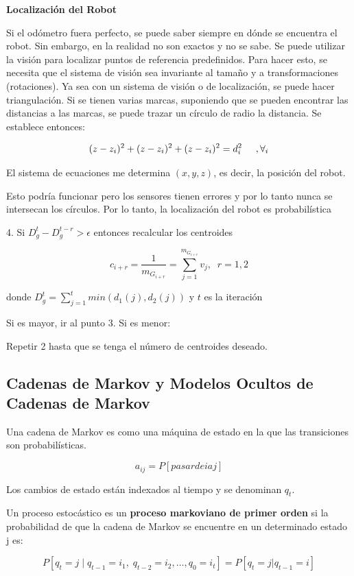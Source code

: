 \textbf{Localización del Robot}


Si el odómetro fuera perfecto, se puede saber siempre en dónde se encuentra el robot. Sin embargo, en la
realidad no son exactos y no se sabe.
Se puede utilizar la visión para localizar puntos de referencia predefinidos.
Para hacer esto, se necesita que el sistema de visión sea invariante al tamaño y a transformaciones
(rotaciones).
Ya sea con un sistema de visión o de localización, se puede hacer triangulación.
Si se tienen varias marcas, suponiendo que se pueden encontrar las distancias a las marcas, se puede trazar un
círculo de radio la distancia.
Se establece entonces:

$$(z-z_i)^2 + (z-z_i)^2 + (z-z_i)^2 =d_{i}^2 \hspace{0.5cm} ,   \forall_i$$

El sistema de ecuaciones me determina $(x , y , z)$, es decir, la posición del robot.

Esto podría funcionar pero los sensores tienen errores y por lo tanto nunca se intersecan los círculos.
Por lo tanto, la localización del robot es probabilística

4. Si $D_{g}^t - D_{g}^{t-r} > \epsilon $ entonces recalcular los centroides

$$c_{i+r} = \dfrac{1}{m_{{G}_{i+r}}} = \sum_{j=1}^{m_{{G}_{i+r}}} v_j, \;\;  r=1,2$$

donde $D_{g}^t = \displaystyle\sum_{j=1}^{t} min (d_1 (j),d_2 (j))$ y $t$ es la iteración

Si es mayor, ir al punto 3.
Si es menor:

Repetir 2 hasta que se tenga el número de centroides deseado.

\subsection{Cadenas de Markov y Modelos Ocultos de Cadenas de Markov}

Una cadena de Markov es como una máquina de estado en la que las transiciones son probabilísticas.

$$a_{ij} = P [pasar de i a j]$$

Los cambios de estado están indexados al tiempo y se denominan $q_t$.

Un proceso estocástico es un \textbf{proceso markoviano de primer orden} si la probabilidad de que la cadena de
Markov se encuentre en un determinado estado j es:

$$P[q_t = j \;| \; q_{t-1} = i_1, \; q_{t-2} = i_2,\ldots, q_0 = i_t] = P[q_t = j|q_{t-1} = i]$$

